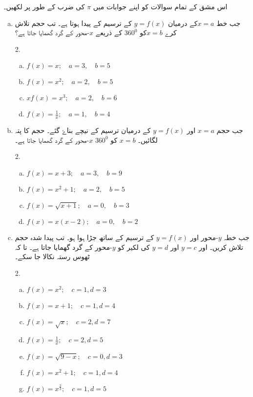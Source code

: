 اس مشق کے تمام سوالات کو اپنے جوابات میں \(\pi\) کی ضرب کے طور پر لکھیں۔
\begin{enumerate}[a.]
\item
جب خط  \(x=a\)کے درمیان \(y=f(x)\) کے ترسیم کے پیدا ہوتا ہے۔ تب حجم تلاش کرے \(x=b\)کو \(360^0\) کے ذریعے  \(x\)-محور کے گرد گھمایا جاتا ہے؟
\begin{multicols}{2.}
\begin{enumerate}[a.]
\item 
\(f(x)=x; \quad a=3, \quad b=5\)
\item
 \(f(x)=x^{2}; \quad a=2,\quad b=5 \)
\item 
\(xf(x)=x^{3};  \quad a=2, \quad  b=6 \)
\item
\(f(x)= \frac {1}{x} ; \quad a=1,\quad b=4\)
\end{enumerate}
\end{multicols}
\item
جب حجم  \(x=a\) اور \(y=f(x)\) کے درمیان ترسیم کے نیچے بناۓ گئے۔ حجم کا پتہ لگائیں۔ \(x=b\) کو \(360^0\) \(x\)-محور کے گرد گھمایا جاتا ہے۔
\begin{multicols}{2.}
\begin{enumerate}[a.]
\item
\(f(x)=x+3;\quad a=3, \quad b=9 \)
\item
 \(f(x)=x^{2}+1;  \quad a=2, \quad b=5 \)
\item
\(f(x)=\sqrt {x+1} ;  \quad a=0, \quad b=3 \)
\item
\(f(x)= x(x-2) ; \quad a=0, \quad b=2\)
\end{enumerate}
\end{multicols}
\item
جب خطہ \(y\)-محور اور \(y=f(x)\)  کے ترسیم کے ساتھ جڑا ہوا ہو۔  تب پیدا شدہ حجم تلاش کریں۔ اور \(y=c\)  اور \(y=d\)  کی لکیر کو \(y\)-محور کے گرد گھمایا جاتا ہے۔ تا کہ ٹھوس رستہ نکالا جا سکے۔ 
\begin{multicols}{2.}
\begin{enumerate}[a.]
\item
\(f(x)=x^{2};  \quad c=1, d=3  \)
\item
\(f(x)=x+1;  \quad c=1, d=4 \)
\item
\(f(x)=\sqrt {x} ; \quad c=2, d=7  \)
\item
\(f(x)= \frac {1}{x} ; \quad c=2, d=5\)
\item
\(f(x)= \sqrt {9-x};  \quad c=0, d=3\)
\item
\( f(x)=x^{2}+1;  \quad c=1, d=4 \)
\item
\(f(x)=x^{\frac {2}{3}} ;  \quad c=1, d=5\)

\end{enumerate}
\end{multicols}
\end{enumerate}
